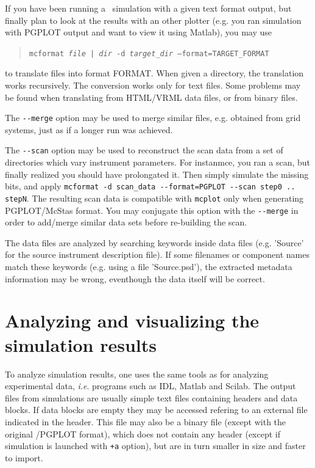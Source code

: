 If you have been running a \MCS\ simulation with a given text format output, but finally plan to look at the results with an other plotter (e.g. you ran simulation with PGPLOT output and want to view it using Matlab), you may use
\begin{quote}
  \texttt{mcformat {\it file | dir} -d {\it target\_dir} --format=TARGET\_FORMAT}
\end{quote}
to translate files into format FORMAT. When given a directory, the translation works recursively. The conversion works only for text files. Some problems may be found when translating from HTML/VRML data files, or from binary files.

The \verb+--merge+ option may be used to merge similar files, e.g. obtained from grid systems, just as if a longer run was achieved.

The \verb+--scan+ option may be used to reconstruct the scan data from a set of directories which vary instrument parameters. For instanmce, you ran a scan, but finally realized you should have prolongated it. Then simply simulate the missing bits, and apply \verb+mcformat -d scan_data --format=PGPLOT --scan step0 .. stepN+. The resulting scan data is compatible with \verb+mcplot+ only when generating PGPLOT/McStas format. You may conjugate this option with the \verb+--merge+ in order to add/merge similar data sets before re-building the scan.

The data files are analyzed by searching keywords inside data files (e.g. 'Source' for the source instrument description file). If some filenames or component names match these keywords (e.g. using a file 'Source.psd'), the extracted metadata information may be wrong, eventhough the data itself will be correct.

\section{Analyzing and visualizing the simulation results}
\label{s:analyze}

To analyze simulation results, one uses the same tools as for analyzing
experimental data, \textit{i.e}. programs such as IDL, Matlab and Scilab.
The output files from simulations are usually simple text files containing headers and data blocks. If data blocks are empty they may be accessed refering to an external file indicated in the header. This file may also be a binary file (except with the original \MCS /PGPLOT format), which does not contain any header (except if simulation is launched with \verb|+a| option), but are in turn smaller in size and faster to import.

